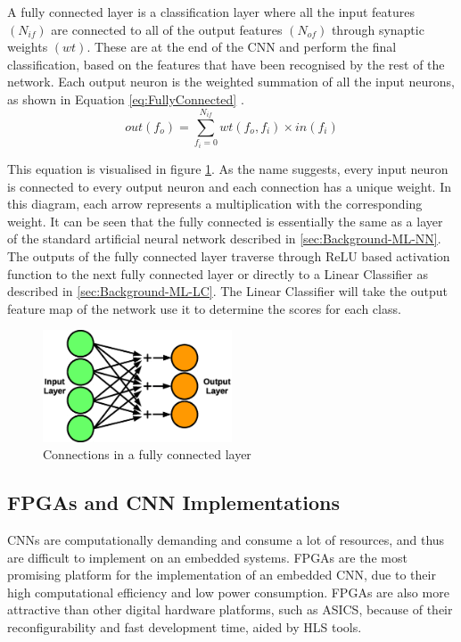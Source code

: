 \documentclass[12pt]{article}
\begin{document}
A fully connected layer is a classification layer where all the input features $(N_{if})$ are connected to all of the output features $(N_{of})$ through synaptic weights $(wt)$. These are at the end of the CNN and perform the final classification, based on the features that have been recognised by the rest of the network. Each output neuron is the weighted summation of all the input neurons, as shown in Equation \ref{eq:FullyConnected} \cite{SudaFpgaAccelerator}.
\begin{equation}
out(f_o)=\sum^{N_{if}}_{f_i=0}wt(f_o,f_i)\times in(f_i)
\label{eq:FullyConnected}
\end{equation}

This equation is visualised in figure \ref{fig:fc}. As the name suggests, every input neuron is connected to every output neuron and each connection has a unique weight. In this diagram, each arrow represents a multiplication with the corresponding weight. It can be seen that the fully connected is essentially the same as a layer of the standard artificial neural network described in \ref{sec:Background-ML-NN}. The outputs of the fully connected layer traverse through ReLU based activation function to the next fully connected layer or directly to a Linear Classifier as described in \ref{sec:Background-ML-LC}. The Linear Classifier will take the output feature map of the network use it to determine the scores for each class.

\begin{figure} [H]
\centering
\includegraphics[width=0.5\textwidth]{figures/fc.eps}
\caption{Connections in a fully connected layer}
\label{fig:fc}
\end{figure}

\subsection{FPGAs and CNN Implementations}
\label{sec:Background-FpgaCnnImpl}


CNNs are computationally demanding and consume a lot of resources, and thus are difficult to implement on an embedded systems. FPGAs are the most promising platform for the implementation of an embedded CNN, due to their high computational efficiency and low power consumption. FPGAs are also more attractive than other digital hardware platforms, such as ASICS, because of their reconfigurability and fast development time, aided by HLS tools.
\end{document}
